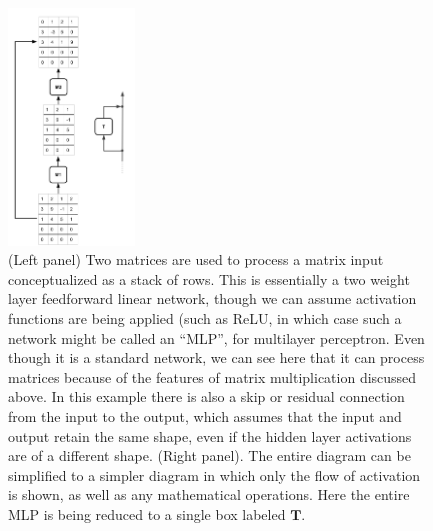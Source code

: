\begin{figure}[h]
\centering
\includegraphics[width=0.3\textwidth]{images/flowPerspective.png}
\caption[Jeff Yoshimi.]{(Left panel) Two matrices are used to process a matrix input conceptualized as a stack of rows. This is essentially a two weight layer feedforward linear network, though we can assume activation functions are being applied (such as ReLU, in which case such a network might be called an ``MLP'', for multilayer perceptron. Even though it is a standard network, we can see here that it can process matrices because of the features of matrix multiplication discussed above. In this example there is also a skip or residual connection from the input to the output, which assumes that the input and output retain the same shape, even if the hidden layer activations are of a different shape. (Right panel). The entire diagram can be simplified to a simpler diagram in which only the flow of activation is shown, as well as any mathematical operations. Here the entire MLP is being reduced to a single box labeled  $\mathbf{T}$. }
\label{flowPerspective}
\end{figure} 

